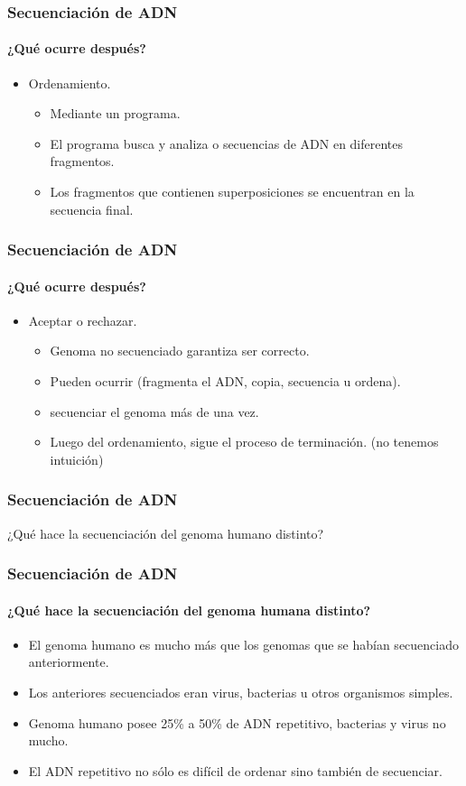 \frame
{
\frametitle{Secuenciación de ADN}
\framesubtitle{¿Qué ocurre después?}
\begin{itemize}
	\item Ordenamiento.
	\begin{itemize}
		\item Mediante un programa.
		\item El programa busca y analiza  o secuencias  de ADN en diferentes fragmentos.
		\item Los fragmentos que contienen superposiciones se encuentran  en la secuencia final.
	\end{itemize}
\end{itemize}
}

\frame
{
\frametitle{Secuenciación de ADN}
\framesubtitle{¿Qué ocurre después?}
\begin{itemize}
	\item Aceptar o rechazar.
	\begin{itemize}
		\item Genoma no secuenciado  garantiza ser correcto.
		\item Pueden ocurrir  (fragmenta el ADN, copia, secuencia u ordena).
		\item {} secuenciar el genoma más de una vez. 
		\item Luego del ordenamiento, sigue el proceso de terminación. (no tenemos intuición)
	\end{itemize}
\end{itemize}
}


\frame
{
\frametitle{Secuenciación de ADN}
\begin{center}
	\huge{¿Qué hace la secuenciación del genoma humano distinto?}
\end{center}
}

\frame
{
\frametitle{Secuenciación de ADN}
\framesubtitle{¿Qué hace la secuenciación del genoma humana distinto?}
\begin{itemize}
	\item El genoma humano es mucho más  que los genomas que se habían secuenciado anteriormente.
	\item Los anteriores secuenciados eran virus, bacterias u otros organismos simples.
	\item Genoma humano posee 25\% a 50\% de ADN repetitivo, bacterias y virus no mucho.
	\item El ADN repetitivo no sólo es difícil de ordenar sino también de secuenciar.
\end{itemize}
}
